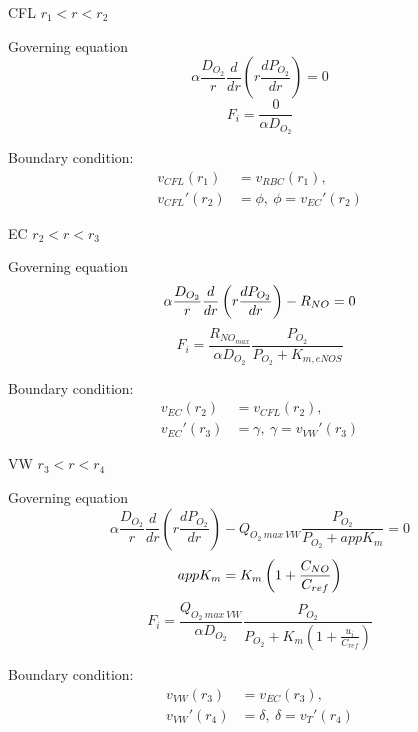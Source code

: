 \documentclass[8pt, a4paper]{article}
\begin{document}
  CFL $r_1<r<r_2$
  
  Governing equation
  \begin{equation*}
  \alpha\frac{D_{O_2}}{r}\frac{d}{dr}\left(r\frac{dP_{O_2}}{dr}\right)=0
  \end{equation*}
  \begin{equation*}
  F_i=\frac{0}{\alpha D_{O_2}}
  \end{equation*}
  
  Boundary condition:
  \begin{align*}
  v_{CFL}(r_1)&=v_{RBC}(r_1),\\
  v_{CFL}'(r_2)&=\phi,\:\phi=v_{EC}'(r_2)
  \end{align*}
  
  EC $r_2<r<r_3$

  Governing equation
  \begin{equation*}
  \alpha\frac{D_{O_2}}{r}\frac{d}{dr}\left(r\frac{dP_{O_2}}{dr}\right)-R_{NO}=0
  \end{equation*}
  \begin{equation*}
  F_i=\frac{R_{NO_{max}}}{\alpha D_{O_2}}\frac{P_{O_2}}{P_{O_2}+K_{m,eNOS}}
  \end{equation*}
  
  Boundary condition:
  \begin{align*}
  v_{EC}(r_2)&=v_{CFL}(r_2),\\
  v_{EC}'(r_3)&=\gamma,\:\gamma=v_{VW}'(r_3)
  \end{align*}
  
  VW $r_3<r<r_4$
  
  Governing equation
  \begin{equation*}
  \alpha\frac{D_{O_2}}{r}\frac{d}{dr}\left(r\frac{dP_{O_2}}{dr}\right)-Q_{O_2\:
  max\:VW}\frac{P_{O_2}}{P_{O_2}+appK_m}=0
  \end{equation*}
  \begin{equation}
  appK_m=K_m\left(1+\frac{C_{NO}}{C_{ref}}\right)
  \end{equation}
  \begin{equation*}
  F_i=\frac{Q_{O_2\:max\:VW}}{\alpha 
  D_{O_2}}\frac{P_{O_2}}{P_{O_2}+K_m\left(1+\frac{u_i}{C_{ref}}\right)}
  \end{equation*}
  
  Boundary condition:
  \begin{align*}
  v_{VW}(r_3)&=v_{EC}(r_3),\\
  v_{VW}'(r_4)&=\delta,\:\delta=v_{T}'(r_4)
  \end{align*}
  
\end{document}
